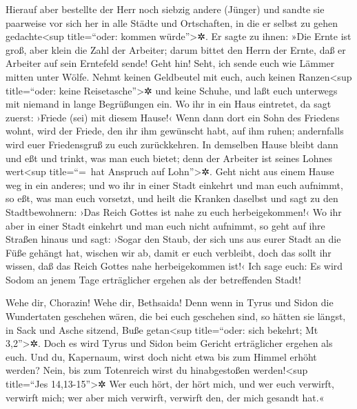 Hierauf aber bestellte der Herr noch siebzig andere
(Jünger) und sandte sie paarweise vor sich her in alle Städte und
Ortschaften, in die er selbst zu gehen gedachte\textless sup
title=``oder: kommen würde''\textgreater✲.  Er sagte zu
ihnen: »Die Ernte ist groß, aber klein die Zahl der Arbeiter; darum
bittet den Herrn der Ernte, daß er Arbeiter auf sein Erntefeld sende!
 Geht hin! Seht, ich sende euch wie Lämmer mitten unter
Wölfe.  Nehmt keinen Geldbeutel mit euch, auch keinen
Ranzen\textless sup title=``oder: keine Reisetasche''\textgreater✲ und
keine Schuhe, und laßt euch unterwegs mit niemand in lange Begrüßungen
ein.  Wo ihr in ein Haus eintretet, da sagt zuerst:
›Friede (sei) mit diesem Hause!‹  Wenn dann dort ein Sohn
des Friedens wohnt, wird der Friede, den ihr ihm gewünscht habt, auf ihm
ruhen; andernfalls wird euer Friedensgruß zu euch zurückkehren.
 In demselben Hause bleibt dann und eßt und trinkt, was
man euch bietet; denn der Arbeiter ist seines Lohnes wert\textless sup
title=``=~hat Anspruch auf Lohn''\textgreater✲. Geht nicht aus einem
Hause weg in ein anderes;  und wo ihr in einer Stadt
einkehrt und man euch aufnimmt, so eßt, was man euch vorsetzt,
 und heilt die Kranken daselbst und sagt zu den
Stadtbewohnern: ›Das Reich Gottes ist nahe zu euch herbeigekommen!‹
 Wo ihr aber in einer Stadt einkehrt und man euch nicht
aufnimmt, so geht auf ihre Straßen hinaus und sagt: 
›Sogar den Staub, der sich uns aus eurer Stadt an die Füße gehängt hat,
wischen wir ab, damit er euch verbleibt, doch das sollt ihr wissen, daß
das Reich Gottes nahe herbeigekommen ist!‹  Ich sage
euch: Es wird Sodom an jenem Tage erträglicher ergehen als der
betreffenden Stadt!

 Wehe dir, Chorazin! Wehe dir, Bethsaida! Denn wenn in
Tyrus und Sidon die Wundertaten geschehen wären, die bei euch geschehen
sind, so hätten sie längst, in Sack und Asche sitzend, Buße
getan\textless sup title=``oder: sich bekehrt; Mt 3,2''\textgreater✲.
 Doch es wird Tyrus und Sidon beim Gericht erträglicher
ergehen als euch.  Und du, Kapernaum, wirst doch nicht
etwa bis zum Himmel erhöht werden? Nein, bis zum Totenreich wirst du
hinabgestoßen werden!\textless sup title=``Jes 14,13-15''\textgreater✲
 Wer euch hört, der hört mich, und wer euch verwirft,
verwirft mich; wer aber mich verwirft, verwirft den, der mich gesandt
hat.«


